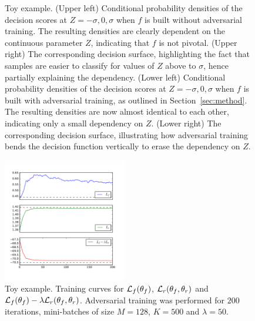 \documentclass[twocolumn,superscriptaddress,aps]{revtex4-1}
\theoremstyle{plain}
\begin{document}
\begin{figure}
\begin{center}
    \end{center}
    \vspace{-1cm}
    \caption{Toy example.
    (Upper left) Conditional probability densities of the decision scores at $Z=-\sigma, 0, \sigma$
       when $f$ is built without adversarial training. The resulting densities
       are clearly dependent on the continuous parameter $Z$, indicating that $f$ is not pivotal.
    (Upper right) The corresponding decision surface, highlighting
       the fact that samples are easier to classify for values of $Z$ above to $\sigma$,
       hence partially explaining the dependency.
    (Lower left) Conditional probability densities of the decision scores at $Z=-\sigma, 0, \sigma$ when $f$ is
       built with adversarial training, as outlined in Section~\ref{sec:method}.
       The resulting densities are now almost identical to each other, indicating only a
       small dependency on $Z$.
    (Lower right) The corresponding decision surface, illustrating how adversarial
       training bends the decision function vertically to erase the dependency on $Z$.
    }
    \label{fig:toy}
\end{figure}

\begin{figure}
    \includegraphics[width=0.48\textwidth]{figures/training.pdf}
    \vspace{-1cm}
    \caption{Toy example. Training curves for ${\cal L}_f(\theta_f)$, ${\cal L}_r(\theta_f, \theta_r)$
             and ${\cal L}_f(\theta_f) - \lambda {\cal L}_r(\theta_f, \theta_r)$.
             Adversarial training was performed for $200$ iterations, mini-batches of size $M=128$, $K=500$ and $\lambda=50$.}
    \label{fig:toy-training}
\end{figure}
\end{document}

